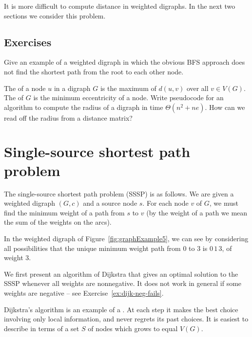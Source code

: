 It is more difficult to compute distance in weighted digraphs. In the
next two sections we consider this problem.


\subsection*{Exercises}


\begin{Exercise}
\label{ex:BFSfails}
Give an example of a weighted digraph in which the obvious BFS approach
does not find the shortest path from the root to each other node.

\end{Exercise}

\begin{Exercise}
\label{ex:radius}
The  of a node $u$ in a  digraph $G$  is the
maximum of $d(u, v)$ over all $v\in V(G)$. The  of $G$
is the minimum eccentricity of a node. Write pseudocode for an
algorithm to compute the radius of a digraph in time $\Theta(n^2 +
ne)$. How can we read off the radius from a distance matrix?

\end{Exercise}

\section{Single-source shortest path problem}
\label{sec:SSSP}

The single-source shortest path problem (SSSP) is as follows. We are given a weighted digraph $(G, c)$ and a source node $s$. For each node $v$ of $G$, we must find the minimum weight of a path from $s$ to $v$ (by the weight of a path we mean the sum of the weights on the arcs).

\begin{Example}
\label{eg:SSSP}
In the weighted digraph of Figure~\ref{fig:graphExample5}, we can see by
considering all possibilities that the unique minimum weight path from
$0$ to $3$ is $0\, 1\, 3$, of weight $3$.

\end{Example}

We first present an algorithm of Dijkstra that gives an optimal solution to the SSSP whenever all weights are nonnegative. It does not work in general if some weights are negative -- see Exercise~\ref{ex:dijk-neg-fails}. 

Dijkstra's algorithm is an example of a . At
each step it makes the best choice involving only local information,
and never regrets its past choices. It is easiest to describe in terms of
a set $S$ of nodes which grows to equal $V(G)$. 


